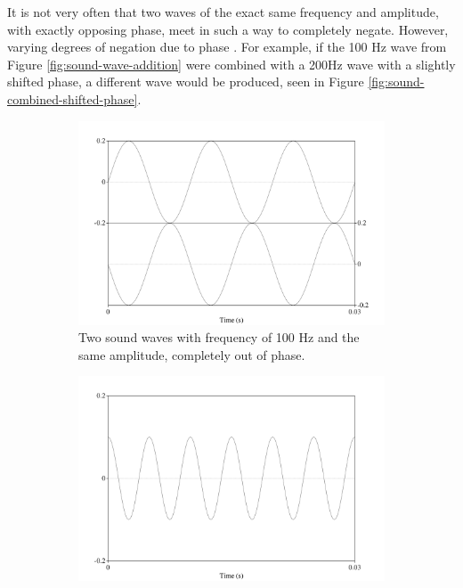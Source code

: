 It is not very often that two waves of the exact same frequency and amplitude, with exactly opposing phase, meet in such a way to completely negate.  However, varying degrees of negation \DIFdelbegin {}\DIFdelend \DIFaddbegin {}\DIFaddend due to phase \DIFaddbegin {}\DIFaddend .  For example, if the 100 Hz wave from Figure \ref{fig:sound-wave-addition} were combined with a 200Hz wave with a slightly shifted phase, a different wave would be produced, seen in Figure \ref{fig:sound-combined-shifted-phase}.  

\begin{figure}[h!]
\begin{subfigure}{0.5\textwidth}
  \includegraphics[width=\textwidth]{figure/wave-out-of-phase.png}
  \caption{Two sound waves with frequency of 100 Hz and the same amplitude, completely out of phase.}
  \label{fig:wave-out-of-phase2}
\end{subfigure}
\qquad
\begin{subfigure}{0.5\textwidth}
  \includegraphics[width=\textwidth]{figure/sound-wave-addition-200hz-shifted.png}

\end{subfigure}
\end{figure}
